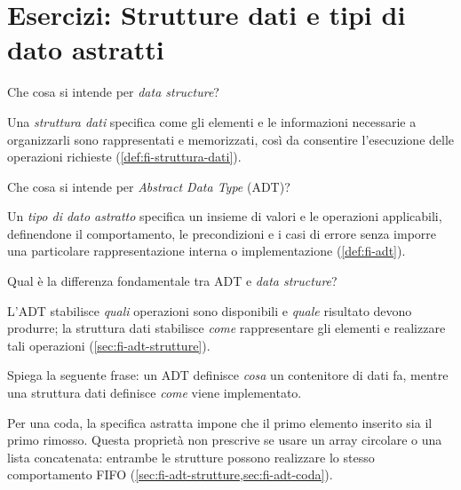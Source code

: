 \chapter{Esercizi: Strutture dati e tipi di dato astratti}
\label{chap:esercizi-strutture-dati-adt}

\begin{exercise}
\label{ex:fi-esercizi-strutture-dati-struttura-dati}
Che cosa si intende per \emph{data structure}?
\end{exercise}

Una \emph{struttura dati} specifica come gli elementi e le informazioni
necessarie a organizzarli sono rappresentati e memorizzati, così da consentire
l'esecuzione delle operazioni richieste (\cref{def:fi-struttura-dati}).

\begin{exercise}
\label{ex:fi-esercizi-strutture-dati-definizione-adt}
Che cosa si intende per \emph{Abstract Data Type} (ADT)?
\end{exercise}

Un \emph{tipo di dato astratto} specifica un insieme di valori
e le operazioni applicabili, definendone il comportamento,
le precondizioni e i casi di errore senza imporre una
particolare rappresentazione interna o implementazione
(\cref{def:fi-adt}).

\begin{exercise}
\label{ex:fi-esercizi-strutture-dati-adt-struttura-differenza}
Qual è la differenza fondamentale tra ADT e \emph{data structure}?
\end{exercise}

L'ADT stabilisce \emph{quali} operazioni sono disponibili e \emph{quale}
risultato devono produrre; la struttura dati stabilisce \emph{come}
rappresentare gli elementi e realizzare tali operazioni
(\cref{sec:fi-adt-strutture}).

\begin{exercise}
\label{ex:fi-esercizi-strutture-dati-cosa-come}
Spiega la seguente frase: un ADT definisce \emph{cosa} un contenitore di dati
fa, mentre una struttura dati definisce \emph{come} viene implementato.
\end{exercise}

Per una coda, la specifica astratta impone che il primo elemento inserito sia il
primo rimosso. Questa proprietà non prescrive se usare un array circolare o una
lista concatenata: entrambe le strutture possono realizzare lo stesso
comportamento FIFO (\cref{sec:fi-adt-strutture,sec:fi-adt-coda}).

